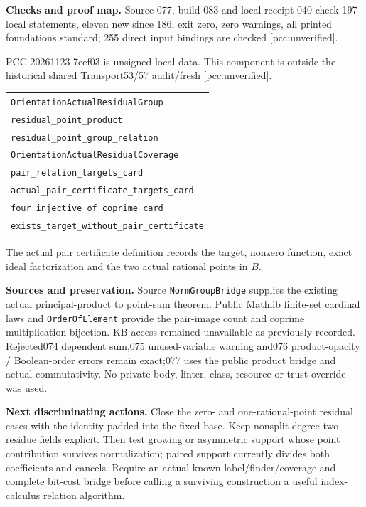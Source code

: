 \documentclass[11pt]{article}
\begin{document}
\textbf{Checks and proof map.}
Source 077, build 083 and local receipt 040 check 197 local statements, eleven new since 186,
exit zero, zero warnings, all printed foundations standard; 255 direct input
bindings are checked [pcc:unverified].

PCC-20261123-7eef03 is unsigned local data. This component is outside the
historical shared Transport53/57 audit/fresh [pcc:unverified].
\begin{center}\begin{tabular}{l}
\texttt{OrientationActualResidualGroup}\\
\texttt{residual\_point\_product}\\
\texttt{residual\_point\_group\_relation}\\[4pt]
\texttt{OrientationActualResidualCoverage}\\
\texttt{pair\_relation\_targets\_card}\\
\texttt{actual\_pair\_certificate\_targets\_card}\\
\texttt{four\_injective\_of\_coprime\_card}\\
\texttt{exists\_target\_without\_pair\_certificate}
\end{tabular}\end{center}
The actual pair certificate definition records the target, nonzero function,
exact ideal factorization and the two actual rational points in \(B\).

\textbf{Sources and preservation.}
Source \texttt{NormGroupBridge} supplies the existing actual principal-product
to point-sum theorem. Public Mathlib finite-set cardinal laws and
\texttt{OrderOfElement} provide the pair-image count and coprime multiplication
bijection. KB access remained unavailable as previously recorded.
Rejected074 dependent sum,075 unused-variable warning and076 product-opacity /
Boolean-order errors remain exact;077 uses the public product bridge and actual
commutativity. No private-body, linter, class, resource or trust override was used.

\textbf{Next discriminating actions.}
Close the zero- and one-rational-point residual cases with the identity padded
into the fixed base. Keep nonsplit degree-two residue fields explicit.
Then test growing or asymmetric support whose point contribution survives
normalization; paired support currently divides both coefficients and cancels.
Require an actual known-label/finder/coverage and complete bit-cost bridge before
calling a surviving construction a useful index-calculus relation algorithm.
\end{document}
